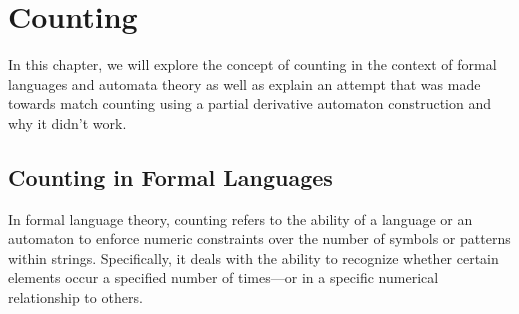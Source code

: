 \chapter{Counting}\label{chap:counting}
In this chapter, we will explore the concept of counting in the context of formal languages and automata theory as well as explain an attempt that was made towards match counting using a partial derivative automaton construction and why it didn't work.

\section{Counting in Formal Languages}
In formal language theory, counting refers to the ability of a language or an automaton to enforce numeric constraints over the number of symbols or patterns within strings. Specifically, it deals with the ability to recognize whether certain elements occur a specified number of times—or in a specific numerical relationship to others.

\section{}